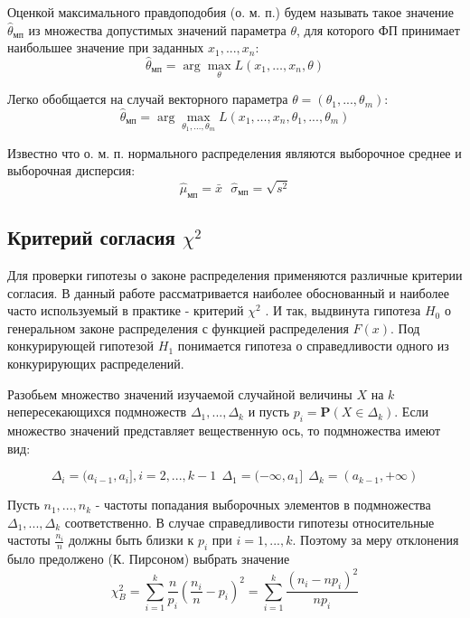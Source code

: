 \documentclass[12pt,a4paper]{article}
\begin{document}
Оценкой максимального правдоподобия (о. м. п.) будем называть такое значение $\widehat{\theta}_{\text{мп}}$ из множества допустимых значений параметра $\theta$, для которого ФП принимает наибольшее значение при заданных $x_1, ..., x_n$:
\begin{equation}
\widehat{\theta}_{\text{мп}}=\arg \max _{\theta} L\left(x_{1}, \ldots, x_{n}, \theta\right)
\end{equation}

Легко обобщается на случай векторного параметра $\theta = (\theta_1, ..., \theta_m)$:
\begin{equation}
\widehat{\theta}_{\text{мп}}=\arg \max _{\theta_1, ..., \theta_m} L\left(x_{1}, \ldots, x_{n}, \theta_1, ..., \theta_m\right)
\end{equation}

Известно \cite[стр. 444]{verrazdely} что о. м. п. нормального распределения являются выборочное среднее и выборочная дисперсия:
\begin{equation}
\widehat{\mu}_{\text{мп}} = \bar{x} \ \ \ \widehat{\sigma}_{\text{мп}} = \sqrt{s^2}
\end{equation}

\subsection{Критерий согласия $\chi^2$}
Для проверки гипотезы о законе распределения применяются различные критерии согласия. В данный работе рассматривается наиболее обоснованный и наиболее часто используемый в практике - критерий $\chi^2$ \cite[стр. 482]{verrazdely}. И так, выдвинута гипотеза $H_0$ о генеральном законе распределения с функцией распределения $F(x)$. Под конкурирующей гипотезой $H_1$ понимается гипотеза о справедливости одного из конкурирующих распределений.

Разобьем множество значений изучаемой случайной величины $X$ на $k$ непересекающихся подмножеств $\Delta_1, ..., \Delta_k$ и пусть $p_i = \textbf{P}(X \in \Delta_k)$. Если множество значений представляет вещественную ось, то подмножества имеют вид:

\begin{equation} 
\Delta_i = (a_{i-1}, a_i], i = 2, ...,k-1 \ \ \Delta_1 = (-\infty, a_1] \ \ \Delta_k = (a_{k-1}, +\infty)
\end{equation}

Пусть $n_1, ..., n_k$ - частоты попадания выборочных элементов в подмножества $\Delta_1, ..., \Delta_k$ соответственно. В случае справедливости гипотезы относительные частоты $\frac{n_i}{n}$ должны быть близки к $p_i$ при $i = 1, ..., k$. Поэтому за меру отклонения было предолжено (К. Пирсоном) \cite[стр. 483]{verrazdely} выбрать значение 
\begin{equation}
\chi^2_{B} = \sum_{i=1}^{k} \frac{n}{p_{i}}\left(\frac{n_{i}}{n}-p_{i}\right)^{2}=\sum_{i=1}^{k} \frac{\left(n_{i} - n p_{i}\right)^{2}}{n p_{i}}
\end{equation}
\end{document}

